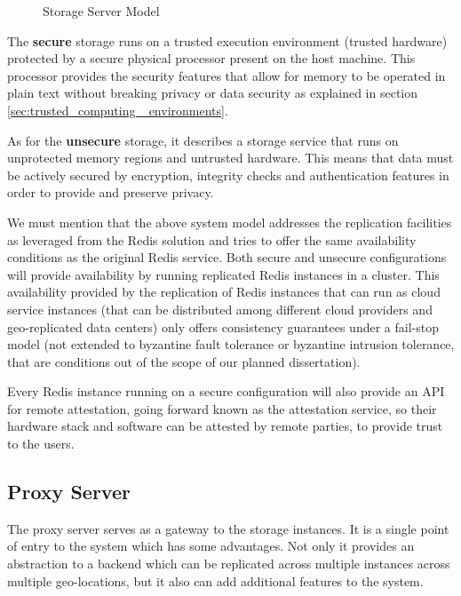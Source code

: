 \begin{figure}[htbp]
  \caption{Storage Server Model}
  \label{fig:storage_server_model}
\end{figure}

The \textbf{secure} storage runs on a trusted execution environment (trusted hardware) protected by a secure physical processor present on the host machine. This processor provides the security features that allow for memory to be operated in plain text without breaking privacy or data security as explained in section \ref{sec:trusted_computing _environments}.

As for the \textbf{unsecure} storage, it describes a storage service that runs on unprotected memory regions and untrusted hardware. This means that data must be actively secured by encryption, integrity checks and authentication features in order to provide and preserve privacy.

We must mention that the above system model addresses the replication facilities as leveraged from the Redis solution and tries to offer the same availability conditions as the original Redis service. Both secure and unsecure configurations will provide availability by running replicated Redis instances in a cluster. This availability provided by the replication of Redis instances that can run as cloud service instances (that can be distributed among different cloud providers and geo-replicated data centers) only offers consistency guarantees under a fail-stop model (not extended to byzantine fault tolerance or byzantine intrusion tolerance, that are conditions out of the scope of our planned dissertation).

Every Redis instance running on a secure configuration will also provide an API for remote attestation, going forward known as the attestation service, so their hardware stack and software can be attested by remote parties, to provide trust to the users.

\subsection{Proxy Server}
\label{ssec:system_model_proxy_server}

The proxy server serves as a gateway to the storage instances. It is a single point of entry to the system which has some advantages. Not only it provides an abstraction to a backend which can be replicated across multiple instances across multiple geo-locations, but it also can add additional features to the system. 

